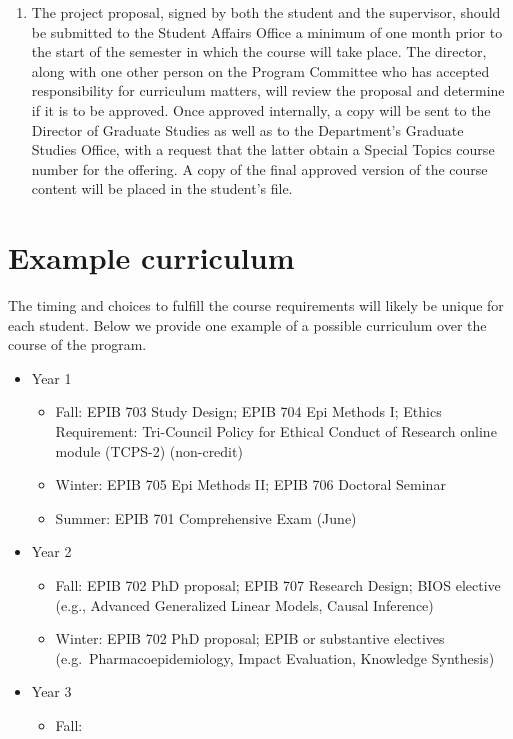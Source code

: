 \documentclass[
]{book}
\providecommand{\tightlist}{%
  \setlength{\itemsep}{0pt}\setlength{\parskip}{0pt}}
\begin{document}
\begin{enumerate}
\def\labelenumi{\arabic{enumi}.}
\setcounter{enumi}{2}
\tightlist
\item
  The project proposal, signed by both the student and the supervisor, should be submitted to the Student Affairs Office a minimum of one month prior to the start of the semester in which the course will take place. The director, along with one other person on the Program Committee who has accepted responsibility for curriculum matters, will review the proposal and determine if it is to be approved. Once approved internally, a copy will be sent to the Director of Graduate Studies as well as to the Department's Graduate Studies Office, with a request that the latter obtain a Special Topics course number for the offering. A copy of the final approved version of the course content will be placed in the student's file.
\end{enumerate}

\hypertarget{example-curriculum}{%
\section{Example curriculum}\label{example-curriculum}}

The timing and choices to fulfill the course requirements will likely be unique for each student. Below we provide one example of a possible curriculum over the course of the program.

\begin{itemize}
\tightlist
\item
  Year 1

  \begin{itemize}
  \tightlist
  \item
    Fall: EPIB 703 Study Design; EPIB 704 Epi Methods I; Ethics Requirement: Tri-Council Policy for Ethical Conduct of Research online module (TCPS-2) (non-credit)\\
  \item
    Winter: EPIB 705 Epi Methods II; EPIB 706 Doctoral Seminar
  \item
    Summer: EPIB 701 Comprehensive Exam (June)
  \end{itemize}
\item
  Year 2

  \begin{itemize}
  \tightlist
  \item
    Fall: EPIB 702 PhD proposal; EPIB 707 Research Design; BIOS elective (e.g., Advanced Generalized Linear Models, Causal Inference)
  \item
    Winter: EPIB 702 PhD proposal; EPIB or substantive electives (e.g.~Pharmacoepidemiology, Impact Evaluation, Knowledge Synthesis)
  \end{itemize}
\item
  Year 3

  \begin{itemize}
  \tightlist
  \item
    Fall:
  \end{itemize}
\end{itemize}
\end{document}
